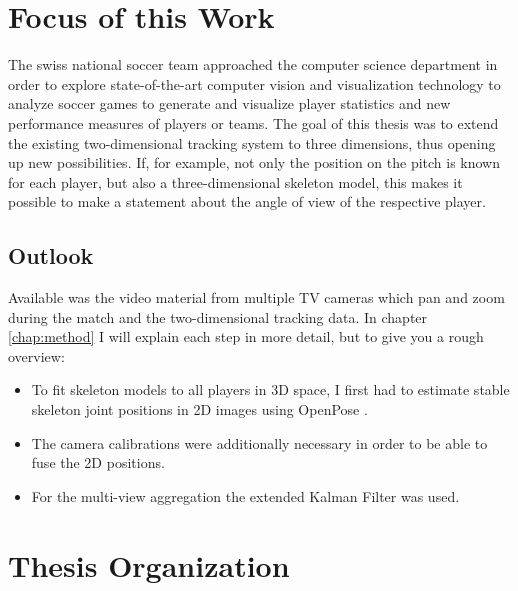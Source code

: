 \section{Focus of this Work}
The swiss national soccer team approached the computer science department in order to explore state-of-the-art computer vision and visualization technology to analyze soccer games to generate and visualize player statistics and new performance measures of players or teams. The goal of this thesis was to extend the existing two-dimensional tracking system to three dimensions, thus opening up new possibilities. If, for example, not only the position on the pitch is known for each player, but also a three-dimensional skeleton model, this makes it possible to make a statement about the angle of view of the respective player.


\subsection{Outlook}
Available was the video material from multiple TV cameras which pan and zoom during the match and the two-dimensional tracking data. In chapter \ref{chap:method} I will explain each step in more detail, but to give you a rough overview:
\begin{itemize}
	\item To fit skeleton models to all players in 3D space, I first had to estimate stable skeleton joint positions in 2D images using OpenPose \cite{openpose}. 
	\item The camera calibrations were additionally necessary in order to be able to fuse the 2D positions.
	\item For the multi-view aggregation the extended Kalman Filter was used.
\end{itemize}

\section{Thesis Organization}
